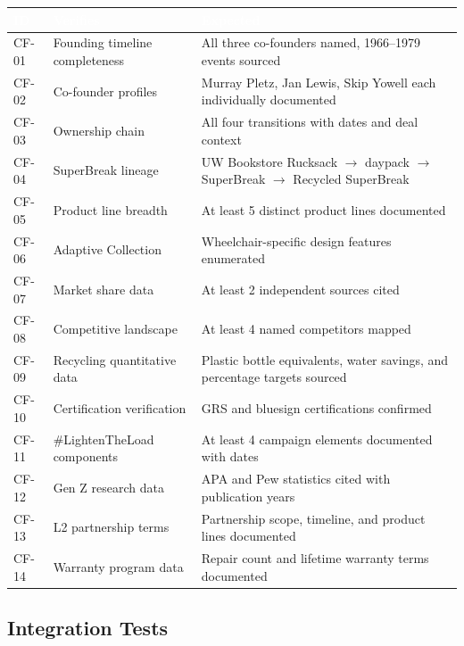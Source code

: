 \documentclass[11pt,letterpaper]{article}
\newcommand{\tableheader}[1]{\textbf{\sffamily\textcolor{white}{#1}}}
\begin{document}
\begin{center}
\begin{tabularx}{\textwidth}{C{1.2cm}L{3.5cm}X}
\toprule
{}
\tableheader{ID} & \tableheader{Verifies} & \tableheader{Expected} \\
\midrule
CF-01 & Founding timeline completeness & All three co-founders named, 1966--1979 events sourced \\
CF-02 & Co-founder profiles & Murray Pletz, Jan Lewis, Skip Yowell each individually documented \\
CF-03 & Ownership chain & All four transitions with dates and deal context \\
CF-04 & SuperBreak lineage & UW Bookstore Rucksack $\rightarrow$ daypack $\rightarrow$ SuperBreak $\rightarrow$ Recycled SuperBreak \\
CF-05 & Product line breadth & At least 5 distinct product lines documented \\
CF-06 & Adaptive Collection & Wheelchair-specific design features enumerated \\
CF-07 & Market share data & At least 2 independent sources cited \\
CF-08 & Competitive landscape & At least 4 named competitors mapped \\
CF-09 & Recycling quantitative data & Plastic bottle equivalents, water savings, and percentage targets sourced \\
CF-10 & Certification verification & GRS and bluesign certifications confirmed \\
CF-11 & \#LightenTheLoad components & At least 4 campaign elements documented with dates \\
CF-12 & Gen Z research data & APA and Pew statistics cited with publication years \\
CF-13 & L2 partnership terms & Partnership scope, timeline, and product lines documented \\
CF-14 & Warranty program data & Repair count and lifetime warranty terms documented \\
\bottomrule
\end{tabularx}
\end{center}

\subsection{Integration Tests}
\end{document}
